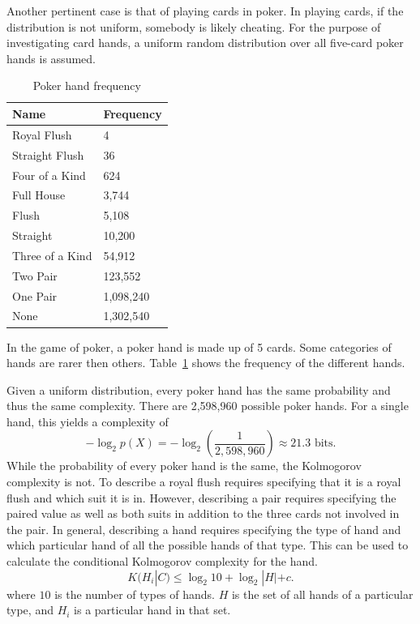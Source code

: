 Another pertinent case is that of playing cards in poker.
In playing cards, if the distribution is not uniform, somebody is likely cheating.
For the purpose of investigating card hands, a uniform random distribution over all five-card poker hands is assumed.

\begin{table}
    \begin{center}
    \begin{tabular}{ll}
        Name & Frequency \\
        \hline
        Royal Flush & 4 \\
        Straight Flush & 36 \\
        Four of a Kind & 624 \\
          Full House & 3,744 \\
               Flush & 5,108 \\
            Straight & 10,200 \\
     Three of a Kind & 54,912 \\
            Two Pair & 123,552 \\
            One Pair & 1,098,240 \\
            None & 1,302,540 \\
    \end{tabular}
    \end{center}
    \caption{Poker hand frequency}
    \label{poker}
\end{table}
In the game of poker,
a poker hand is made up of 5 cards.
Some categories of hands are rarer then others.
Table~\ref{poker} shows the frequency of the different hands.

Given a uniform distribution, every poker hand has the same probability and thus the same complexity.
There are 2,598,960 possible poker hands. 
For a single hand, this yields a complexity of
\begin{equation}
    -\log_2{p(X)} = -\log_2(\frac{1}{2,598,960}) \approx 21.3 \mbox{ bits.}
\end{equation}
While the probability of every poker hand is the same, the Kolmogorov complexity is not.
To describe a royal flush requires specifying that it is a royal flush and which suit it is in.
However, describing a pair requires specifying the paired value as well as both suits in addition to the three cards not involved in the pair.
In general, describing a hand requires specifying the type of hand and which particular hand of all the possible hands of that type.
This can be used to calculate the conditional Kolmogorov complexity for the hand.
\begin{equation}
    \label{kc.card}
    K(H_i|C) \leq \log_2 10 + \log_2 |H| + c \mbox{.}
\end{equation} where $10$ is the number of types of hands. $H$ is the set of all hands of a particular type, and $H_i$ is a particular hand in that set.

